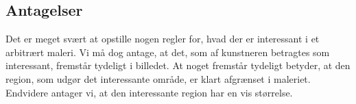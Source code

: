 {\subsection{Antagelser}
Det er meget svært at opstille nogen regler for, hvad der er interessant
i et arbitrært maleri. Vi må dog antage, at det, som af kunstneren
betragtes som interessant, fremstår tydeligt i billedet. At noget
fremstår tydeligt betyder, at den region, som udgør det interessante
område, er klart afgrænset i maleriet. Endvidere antager vi, at den
interessante region har en vis størrelse.

}

